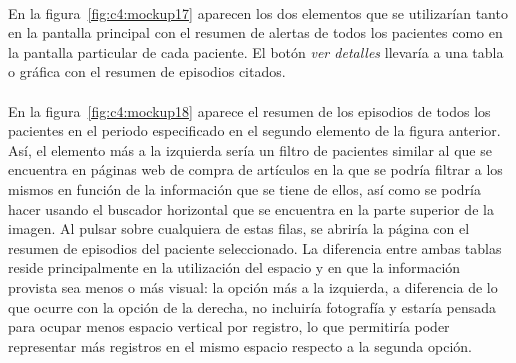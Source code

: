 \paragraph{}
En la figura~\ref{fig:c4:mockup17} aparecen los dos elementos que se utilizarían tanto en la pantalla principal con el resumen de alertas de todos los pacientes como en la pantalla particular de cada paciente. El botón \textit{ver detalles} llevaría a una tabla o gráfica con el resumen de episodios citados.

\paragraph{}
En la figura~\ref{fig:c4:mockup18} aparece el resumen de los episodios de todos los pacientes en el periodo especificado en el segundo elemento de la figura anterior. Así, el elemento más a la izquierda sería un filtro de pacientes similar al que se encuentra en páginas web de compra de artículos en la que se podría filtrar a los mismos en función de la información que se tiene de ellos, así como se podría hacer usando el buscador horizontal que se encuentra en la parte superior de la imagen. Al pulsar sobre cualquiera de estas filas, se abriría la página con el resumen de episodios del paciente seleccionado. La diferencia entre ambas tablas reside principalmente en la utilización del espacio y en que la información provista sea menos o más visual: la opción más a la izquierda, a diferencia de lo que ocurre con la opción de la derecha, no incluiría fotografía y estaría pensada para ocupar menos espacio vertical por registro, lo que permitiría poder representar más registros en el mismo espacio respecto a la segunda opción.

